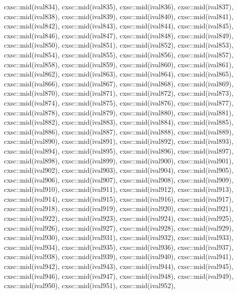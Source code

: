 \begin{DoxyCode}
{  cxsc::mid(ival834),
  cxsc::mid(ival835),
  cxsc::mid(ival836),
  cxsc::mid(ival837),
  cxsc::mid(ival838),
  cxsc::mid(ival839),
  cxsc::mid(ival840),
  cxsc::mid(ival841),
  cxsc::mid(ival842),
  cxsc::mid(ival843),
  cxsc::mid(ival844),
  cxsc::mid(ival845),
  cxsc::mid(ival846),
  cxsc::mid(ival847),
  cxsc::mid(ival848),
  cxsc::mid(ival849),
  cxsc::mid(ival850),
  cxsc::mid(ival851),
  cxsc::mid(ival852),
  cxsc::mid(ival853),
  cxsc::mid(ival854),
  cxsc::mid(ival855),
  cxsc::mid(ival856),
  cxsc::mid(ival857),
  cxsc::mid(ival858),
  cxsc::mid(ival859),
  cxsc::mid(ival860),
  cxsc::mid(ival861),
  cxsc::mid(ival862),
  cxsc::mid(ival863),
  cxsc::mid(ival864),
  cxsc::mid(ival865),
  cxsc::mid(ival866),
  cxsc::mid(ival867),
  cxsc::mid(ival868),
  cxsc::mid(ival869),
  cxsc::mid(ival870),
  cxsc::mid(ival871),
  cxsc::mid(ival872),
  cxsc::mid(ival873),
  cxsc::mid(ival874),
  cxsc::mid(ival875),
  cxsc::mid(ival876),
  cxsc::mid(ival877),
  cxsc::mid(ival878),
  cxsc::mid(ival879),
  cxsc::mid(ival880),
  cxsc::mid(ival881),
  cxsc::mid(ival882),
  cxsc::mid(ival883),
  cxsc::mid(ival884),
  cxsc::mid(ival885),
  cxsc::mid(ival886),
  cxsc::mid(ival887),
  cxsc::mid(ival888),
  cxsc::mid(ival889),
  cxsc::mid(ival890),
  cxsc::mid(ival891),
  cxsc::mid(ival892),
  cxsc::mid(ival893),
  cxsc::mid(ival894),
  cxsc::mid(ival895),
  cxsc::mid(ival896),
  cxsc::mid(ival897),
  cxsc::mid(ival898),
  cxsc::mid(ival899),
  cxsc::mid(ival900),
  cxsc::mid(ival901),
  cxsc::mid(ival902),
  cxsc::mid(ival903),
  cxsc::mid(ival904),
  cxsc::mid(ival905),
  cxsc::mid(ival906),
  cxsc::mid(ival907),
  cxsc::mid(ival908),
  cxsc::mid(ival909),
  cxsc::mid(ival910),
  cxsc::mid(ival911),
  cxsc::mid(ival912),
  cxsc::mid(ival913),
  cxsc::mid(ival914),
  cxsc::mid(ival915),
  cxsc::mid(ival916),
  cxsc::mid(ival917),
  cxsc::mid(ival918),
  cxsc::mid(ival919),
  cxsc::mid(ival920),
  cxsc::mid(ival921),
  cxsc::mid(ival922),
  cxsc::mid(ival923),
  cxsc::mid(ival924),
  cxsc::mid(ival925),
  cxsc::mid(ival926),
  cxsc::mid(ival927),
  cxsc::mid(ival928),
  cxsc::mid(ival929),
  cxsc::mid(ival930),
  cxsc::mid(ival931),
  cxsc::mid(ival932),
  cxsc::mid(ival933),
  cxsc::mid(ival934),
  cxsc::mid(ival935),
  cxsc::mid(ival936),
  cxsc::mid(ival937),
  cxsc::mid(ival938),
  cxsc::mid(ival939),
  cxsc::mid(ival940),
  cxsc::mid(ival941),
  cxsc::mid(ival942),
  cxsc::mid(ival943),
  cxsc::mid(ival944),
  cxsc::mid(ival945),
  cxsc::mid(ival946),
  cxsc::mid(ival947),
  cxsc::mid(ival948),
  cxsc::mid(ival949),
  cxsc::mid(ival950),
  cxsc::mid(ival951),
  cxsc::mid(ival952),
}
\end{DoxyCode}
